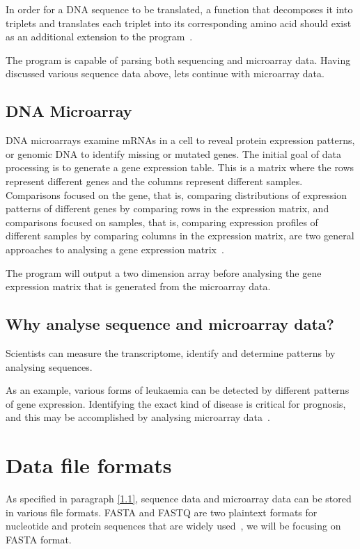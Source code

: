 \documentclass[]{final_report}
\begin{document}
In order for a DNA sequence to be translated, a function that decomposes it into triplets and translates each triplet into its corresponding amino acid should exist as an additional extension to the program~\cite{claverie2006bioinformatics}.

The program is capable of parsing both sequencing and microarray data. Having discussed various sequence data above, lets continue with microarray data.

\subsection{DNA Microarray}
DNA microarrays examine mRNAs in a cell to reveal protein expression patterns, or genomic DNA to identify missing or mutated genes. The initial goal of data processing is to generate a gene expression table. This is a matrix where the rows represent different genes and the columns represent different samples. Comparisons focused on the gene, that is, comparing distributions of expression patterns of different genes by comparing rows in the expression matrix, and comparisons focused on samples, that is, comparing expression profiles of different samples by comparing columns in the expression matrix, are two general approaches to analysing a gene expression matrix~\cite{lesk2019introduction}.  

The program will output a two dimension array before analysing the gene expression matrix that is generated from the microarray data.

\subsection{Why analyse sequence and microarray data? }
Scientists can measure the transcriptome, identify and determine patterns by analysing sequences\cite{lesk2019introduction}.

As an example, various forms of leukaemia can be detected by different patterns of gene expression. Identifying the exact kind of disease is critical for prognosis, and this may be accomplished by analysing microarray data~\cite{lesk2019introduction}.

\section{Data file formats}
As specified in paragraph \ref{1.1}, sequence data and microarray data can be stored in various file formats. FASTA and FASTQ are two plaintext formats for nucleotide and protein sequences that are widely used~\cite{appliedbioinfomatics2019}, we will be focusing on FASTA format.
\end{document}

